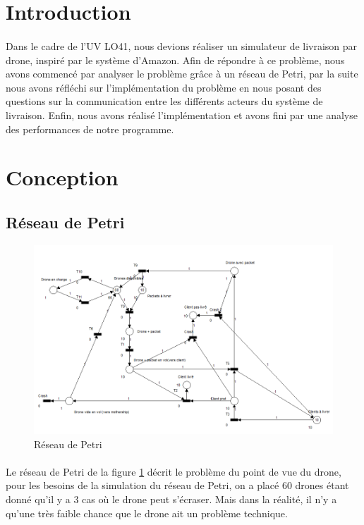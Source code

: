 \documentclass[article, backcover, french, nodocumentinfo]{upmethodology-document}
\begin{document}
	\upmdocumentsummary{}
	\upmdocumentauthors{}
	\upmdocumentinformedpeople{}
	\upmpublicationpage{}
	\thispagestyle{empty}
	\tableofcontents{}
	\newpage{}
	\section*{Introduction}
		\paragraph*{}
			Dans le cadre de l'UV LO41, nous devions réaliser un simulateur de livraison par drone, inspiré par le système d'Amazon. Afin de répondre à ce problème, nous avons commencé par analyser le problème grâce à un réseau de Petri, par la suite nous avons réfléchi sur l'implémentation du problème en nous posant des questions sur la communication entre les différents acteurs du système de livraison. Enfin, nous avons réalisé l'implémentation et avons fini par une analyse des performances de notre programme.
	\section{Conception}
		\subsection{Réseau de Petri}
			\begin{figure}[H]
			  \centering
			  \includegraphics[width=\textwidth]{figures/petri_drones}
			  \caption{Réseau de Petri}
			  \label{fig:petrinet}
			\end{figure}
			\paragraph*{}
				Le réseau de Petri de la figure \ref{fig:petrinet} décrit le problème du point de vue du drone, pour les besoins de la simulation du réseau de Petri, on a placé 60 drones étant donné qu'il y a 3 cas où le drone peut s'écraser. Mais dans la réalité, il n'y a qu'une très faible chance que le drone ait un problème technique.
\end{document}
